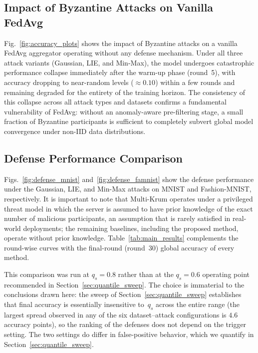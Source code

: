 \documentclass[journal]{IEEEtran}
\begin{document}
\subsection{Impact of Byzantine Attacks on Vanilla FedAvg}

Fig.~\ref{fig:accuracy_plots} shows the impact of Byzantine attacks on a vanilla FedAvg aggregator operating without any defense mechanism. Under all three attack variants (Gaussian, LIE, and Min-Max), the model undergoes catastrophic performance collapse immediately after the warm-up phase (round~5), with accuracy dropping to near-random levels ($\approx 0.10$) within a few rounds and remaining degraded for the entirety of the training horizon. The consistency of this collapse across all attack types and datasets confirms a fundamental vulnerability of FedAvg: without an anomaly-aware pre-filtering stage, a small fraction of Byzantine participants is sufficient to completely subvert global model convergence under non-IID data distributions.

\subsection{Defense Performance Comparison}
\label{sec:defense_comparison}

Figs.~\ref{fig:defense_mnist} and~\ref{fig:defense_famnist} show the defense performance under the Gaussian, LIE, and Min-Max attacks on MNIST and Fashion-MNIST, respectively. It is important to note that Multi-Krum operates under a privileged threat model in which the server is assumed to have prior knowledge of the exact number of malicious participants, an assumption that is rarely satisfied in real-world deployments; the remaining baselines, including the proposed method, operate without prior knowledge. Table~\ref{tab:main_results} complements the round-wise curves with the final-round (round~$30$) global accuracy of every method.

This comparison was run at $q_s = 0.8$ rather than at the $q_s = 0.6$ operating point recommended in Section~\ref{sec:quantile_sweep}. The choice is immaterial to the conclusions drawn here: the sweep of Section~\ref{sec:quantile_sweep} establishes that final accuracy is essentially insensitive to~$q_s$ across the entire range (the largest spread observed in any of the six dataset--attack configurations is $4.6$ accuracy points), so the ranking of the defenses does not depend on the trigger setting. The two settings do differ in false-positive behavior, which we quantify in Section~\ref{sec:quantile_sweep}.
\end{document}
